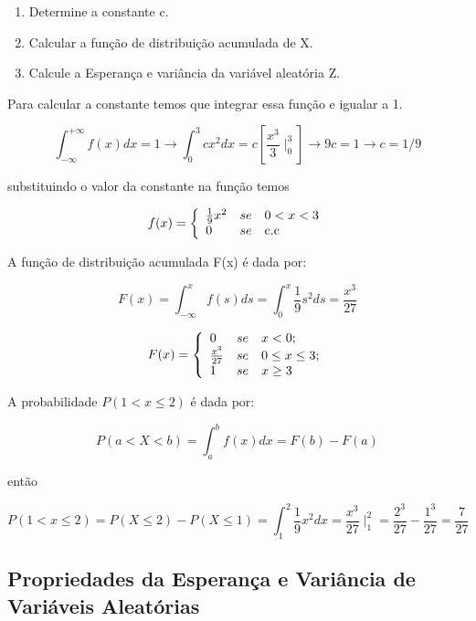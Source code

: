 \begin{enumerate}
    \item Determine a constante c.
    \item Calcular a função de distribuição acumulada de X.
    \item Calcule a Esperança e variância da variável aleatória Z.
\end{enumerate}

Para calcular a constante temos que integrar essa função e igualar
a 1.

$$
\int_{-\infty}^{+\infty}f(x)dx = 1 \rightarrow
\int_{0}^{3}cx^{2}dx = c\left[\frac{x^{3}}{3}\mid^{3}_{0}\right]
\rightarrow 9c = 1 \rightarrow c = 1/9
$$

substituindo o valor da constante na função temos

$$
f(x)=
\left\{%
\begin{array}{ll}
   \frac{1}{9}x^{2}      & se \quad \hbox{$0 < x < 3$} \\
   0           & se \quad \hbox{c.c} \\
\end{array}%
\right.
$$

A função de distribuição acumulada F(x) é dada por:

$$
F(x) = \int^{x}_{-\infty}f(s)ds = \int^{x}_{0}\frac{1}{9}s^{2}ds =
\frac{x^{3}}{27}
$$

$$
F(x)=
\left\{%
\begin{array}{ll}
    0                 & se \quad \hbox{$x < 0$;} \\
   \frac{x^{3}}{27}   & se \quad \hbox{$0 \leq x \leq 3$;} \\
   1                  & se \quad \hbox{$x \geq 3$} \\
\end{array}%
\right.
$$

A probabilidade $P(1 < x \leq 2)$ é dada por:

$$
P(a < X < b)=\int^{b}_{a}f(x)dx = F(b)-F(a)
$$

então

$$P(1 < x \leq 2) = P(X \leq 2) - P(X \leq 1) = \int^{2}_{1}\frac{1}{9}x^{2}dx = \frac{x^{3}}{27}\mid^{2}_{1}=
\frac{2^{3}}{27}-\frac{1^{3}}{27}=\frac{7}{27}$$



\subsection{Propriedades da Esperança e Variância de Variáveis Aleatórias}

